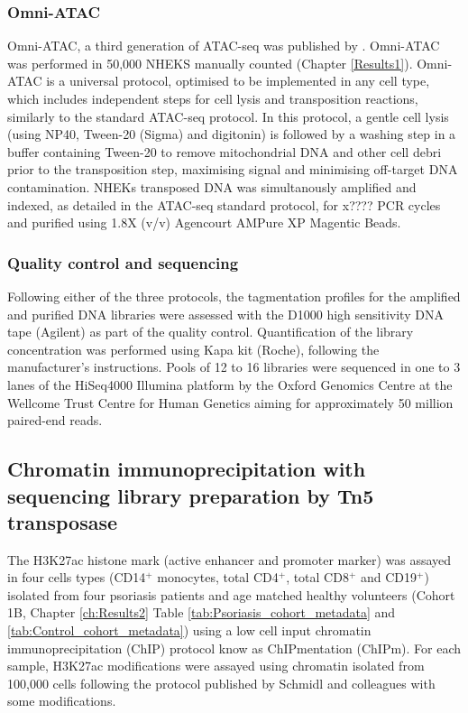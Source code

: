 \subsubsection{Omni-ATAC}
Omni-ATAC, a third generation of ATAC-seq was published by \parencite{Corces2017}. Omni-ATAC was performed in 50,000 NHEKS manually counted (Chapter \ref{Results1}). Omni-ATAC is a universal protocol, optimised to be implemented in any cell type, which includes independent steps for cell lysis and transposition reactions, similarly to the standard ATAC-seq protocol. In this protocol, a gentle cell lysis (using NP40, 
Tween-20 (Sigma) and digitonin) is followed by a washing step in a buffer containing Tween-20 to remove mitochondrial DNA and other cell debri prior to the transposition step, maximising signal and minimising off-target DNA contamination. NHEKs transposed DNA was simultanously amplified and indexed, as detailed in the ATAC-seq standard protocol, for x???? PCR cycles and purified using 1.8X (v/v) Agencourt AMPure XP Magentic Beads. 


\subsubsection{Quality control and sequencing}
Following either of the three protocols, the tagmentation profiles for the amplified and purified DNA libraries were assessed with the D1000 high sensitivity DNA tape (Agilent) as part of the quality control. Quantification of the library concentration was performed using Kapa kit (Roche), following the manufacturer's instructions. Pools of 12 to 16 libraries were sequenced in one to 3 lanes of the HiSeq4000 Illumina platform by the Oxford Genomics Centre at the Wellcome Trust Centre for Human Genetics aiming for approximately 50 million paired-end reads.


\subsection{Chromatin immunoprecipitation with sequencing library preparation by Tn5 transposase}
The H3K27ac histone mark (active enhancer and promoter marker) was assayed in four cells types (CD14$^+$ monocytes, total CD4$^+$, total CD8$^+$ and CD19$^+$) isolated from four psoriasis patients and age matched healthy volunteers (Cohort 1B, Chapter \ref{ch:Results2} Table \ref{tab:Psoriasis_cohort_metadata} and \ref{tab:Control_cohort_metadata}) using a low cell input chromatin immunoprecipitation (ChIP) protocol know as ChIPmentation (ChIPm)\parencite{Schmidl2015}. For each sample, H3K27ac modifications were assayed using chromatin isolated from 100,000 cells following the protocol published by Schmidl and colleagues with some modifications. 

